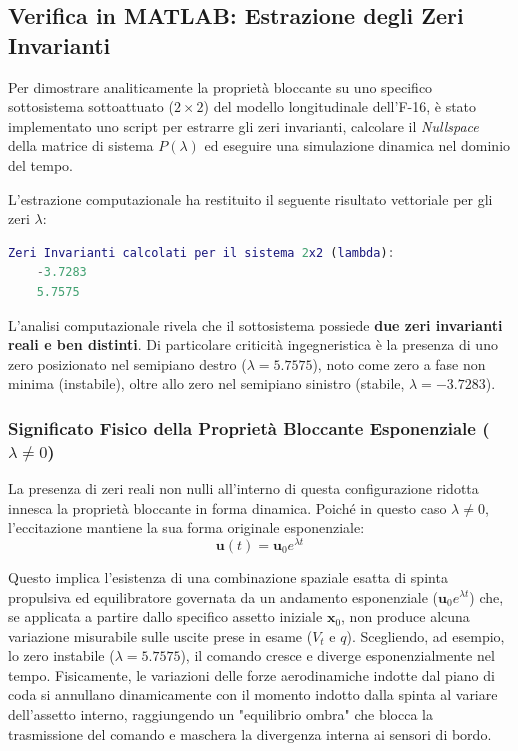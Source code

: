 \subsection{Verifica in MATLAB: Estrazione degli Zeri Invarianti}
Per dimostrare analiticamente la proprietà bloccante su uno specifico sottosistema sottoattuato ($2 \times 2$) del modello longitudinale dell'F-16, è stato implementato uno script per estrarre gli zeri invarianti, calcolare il \textit{Nullspace} della matrice di sistema $P(\lambda)$ ed eseguire una simulazione dinamica nel dominio del tempo.

L'estrazione computazionale ha restituito il seguente risultato vettoriale per gli zeri $\lambda$:
\begin{lstlisting}[language=MATLAB]
	Zeri Invarianti calcolati per il sistema 2x2 (lambda):
	-3.7283
	5.7575
\end{lstlisting}

L'analisi computazionale rivela che il sottosistema possiede \textbf{due zeri invarianti reali e ben distinti}. Di particolare criticità ingegneristica è la presenza di uno zero posizionato nel semipiano destro ($\lambda = 5.7575$), noto come zero a fase non minima (instabile), oltre allo zero nel semipiano sinistro (stabile, $\lambda = -3.7283$).

\subsubsection{Significato Fisico della Proprietà Bloccante Esponenziale ($\lambda \neq 0$)}
La presenza di zeri reali non nulli all'interno di questa configurazione ridotta innesca la proprietà bloccante in forma dinamica. Poiché in questo caso $\lambda \neq 0$, l'eccitazione mantiene la sua forma originale esponenziale:
\begin{equation}
	\mathbf{u}(t) = \mathbf{u}_0 e^{\lambda t} 
\end{equation}

Questo implica l'esistenza di una combinazione spaziale esatta di spinta propulsiva ed equilibratore governata da un andamento esponenziale ($\mathbf{u}_0 e^{\lambda t}$) che, se applicata a partire dallo specifico assetto iniziale $\mathbf{x}_0$, non produce alcuna variazione misurabile sulle uscite prese in esame ($V_t$ e $q$). Scegliendo, ad esempio, lo zero instabile ($\lambda = 5.7575$), il comando cresce e diverge esponenzialmente nel tempo. Fisicamente, le variazioni delle forze aerodinamiche indotte dal piano di coda si annullano dinamicamente con il momento indotto dalla spinta al variare dell'assetto interno, raggiungendo un "equilibrio ombra" che blocca la trasmissione del comando e maschera la divergenza interna ai sensori di bordo. 

